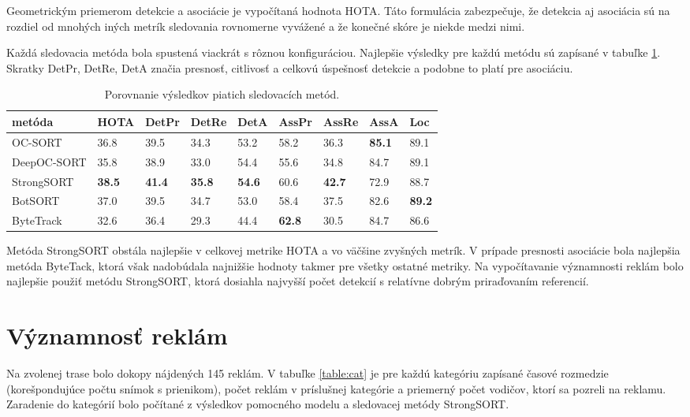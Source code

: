 Geometrickým priemerom detekcie a asociácie je vypočítaná hodnota HOTA. Táto formulácia zabezpečuje, že detekcia aj asociácia sú na rozdiel od mnohých iných metrík sledovania rovnomerne vyvážené a že konečné skóre je niekde medzi nimi.

Každá sledovacia metóda bola spustená viackrát s rôznou konfiguráciou. Najlepšie výsledky pre každú metódu sú zapísané v tabuľke \ref{table:hota1}. Skratky DetPr, DetRe, DetA značia presnosť, citlivosť a celkovú úspešnosť detekcie a podobne to platí pre asociáciu.
\\
\begin{table}[ht]
\centering
\begin{tabular}{|l l l l l l l l l|}
 \hline
metóda & HOTA & DetPr & DetRe & DetA & AssPr & AssRe & AssA & Loc \\ [0.5ex]
 \hline
OC-SORT & 36.8  &  39.5  &  34.3  &  53.2  &   58.2  &  36.3   &  \textbf{85.1}  &  89.1 \\ [0.1ex]
DeepOC-SORT & 35.8 &   38.9  &  33.0  &  54.4  &  55.6  &  34.8  &  84.7  &  89.1 \\ [0.1ex]
StrongSORT & \textbf{38.5}  &  \textbf{41.4}  &  \textbf{35.8}  &  \textbf{54.6} &   60.6   &   \textbf{42.7}   & 72.9   & 88.7 \\ [0.1ex]
BotSORT & 37.0  &  39.5  &  34.7  &  53.0  &  58.4  &  37.5 &   82.6  &  \textbf{89.2} \\ [0.1ex]
ByteTrack & 32.6  &  36.4  &  29.3  &  44.4  &  \textbf{62.8}  &  30.5  &  84.7  &  86.6 \\ [0.1ex]
 \hline
\end{tabular}
\caption{Porovnanie výsledkov piatich sledovacích metód.}
\label{table:hota1}
\end{table}

Metóda StrongSORT obstála najlepšie v celkovej metrike HOTA a vo väčšine zvyšných metrík. V prípade presnosti asociácie bola najlepšia metóda ByteTack, ktorá však nadobúdala najnižšie hodnoty takmer pre všetky ostatné metriky. Na vypočítavanie významnosti reklám bolo najlepšie použiť metódu StrongSORT, ktorá dosiahla najvyšší počet detekcií s relatívne dobrým priraďovaním referencií.

\section{Významnosť reklám}

Na zvolenej trase bolo dokopy nájdených 145 reklám. V tabuľke \ref{table:cat} je pre každú kategóriu zapísané časové rozmedzie (korešpondujúce počtu snímok s prienikom), počet reklám v príslušnej kategórie a priemerný počet vodičov, ktorí sa pozreli na reklamu. Zaradenie do kategórií bolo počítané z výsledkov pomocného modelu a sledovacej metódy StrongSORT.

